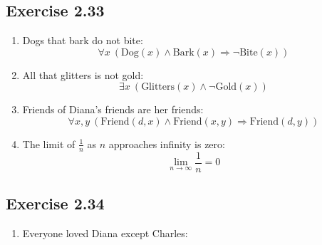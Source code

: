 \documentclass[leqno]{article}
\renewcommand{\implies}{\Rightarrow}
\begin{document}
\subsection*{Exercise 2.33}
\begin{enumerate}
  \item
  Dogs that bark do not bite:
  \[ \forall x ~ (\text{Dog}(x) \land \text{Bark}(x) \implies \neg \text{Bite}(x)) \]

  \item
  All that glitters is not gold:
  \[ \exists x ~ (\text{Glitters}(x) \land \neg \text{Gold}(x)) \]

  \item
  Friends of Diana's friends are her friends:
  \[ \forall x,y ~ (\text{Friend}(d,x) \land \text{Friend}(x,y) \implies \text{Friend}(d,y)) \]

  \item
  The limit of $\frac{1}{n}$ as $n$ approaches infinity is zero:
  \[ \lim_{n \to \infty} \frac{1}{n} = 0 \]
\end{enumerate}

\subsection*{Exercise 2.34}
\begin{enumerate}
  \item
  Everyone loved Diana except Charles:
\end{enumerate}
\end{document}

